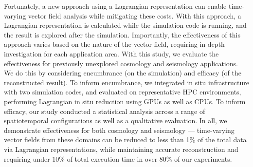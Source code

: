 %
Fortunately, a new approach using a Lagrangian representation can 
enable time-varying vector field analysis while mitigating these costs.
%
With this approach, a Lagrangian representation is calculated while the simulation code is running, and the result is explored after the simulation.
%
Importantly, 
 the effectiveness of this approach varies based on the nature of the vector field, 
requiring in-depth investigation for each application area.
%
With this study, we evaluate the effectiveness for previously unexplored cosmology and seismology
applications. %
%
We do this by considering encumbrance (on the simulation) and efficacy (of the reconstructed result).
%
To inform encumbrance, we 
integrated in situ infrastructure with two simulation codes, 
and evaluated on representative HPC environments,
performing Lagrangian in situ reduction using GPUs as well as CPUs.
%
To inform efficacy, our study conducted a statistical analysis across a range of spatiotemporal configurations as well as a qualitative evaluation.
%
In all, we demonstrate effectiveness for both cosmology and seismology --- time-varying vector fields from these domains can be reduced to less than 1\% of the total data via Lagrangian representations, while maintaining accurate reconstruction and requiring under 10\% of total execution time in over 80\% of our experiments.
